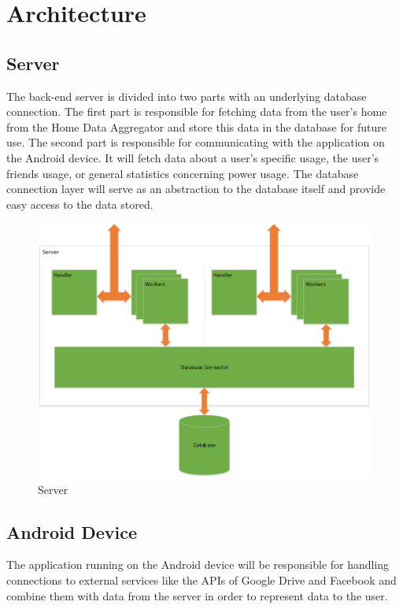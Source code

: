 \newpage
\section{Architecture}
\subsection{Server}
The back-end server is divided into two parts with an underlying database connection. 
The first part is responsible for fetching data from the user's home from the Home Data Aggregator and store
this data in the database for future use. The second part is responsible for communicating with the application on the 
Android device. It will fetch data about a user's specific usage, the user's friends usage, or general statistics 
concerning power usage. The database connection layer will serve as an abstraction to the database itself and provide 
easy access to the data stored.

\begin{figure}[H]
\includegraphics[width=\textwidth]{ch/projectPlan/fig/server.png}
\caption{Server}
\end{figure}

\subsection{Android Device}
The application running on the Android device will be responsible for handling connections to external 
services like the APIs of Google Drive and Facebook and combine them with data from the server in order to represent 
data to the user.

